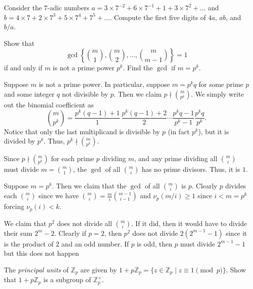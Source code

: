 \documentclass[12 pt, letterpaper]{hmcpset}
\begin{document}
\pagebreak

\begin{problem}[(3)]
	Consider the $7$-adic numbers $a = 3 \times 7^{-2} + 6 \times 7^{-1} + 1 + 3 \times 7^{2} + \dots$ and $b = 4 \times 7 + 2 \times 7^{3} + 5 \times 7^{4} + 7^{5} + \dots$. Compute the first five digits of $4a$, $ab$, and $b / a$.
\end{problem}

\pagebreak

\begin{problem}[(4)]
	Show that
	\[
		\gcd \left \{ \binom{m}{1}, \binom{m}{2}, \dots, \binom{m}{m - 1} \right \} = 1
	\]
	if and only if $m$ is not a prime power $p^{k}$. Find the $\gcd$ if $m = p^{k}$.
\end{problem}

\begin{solution}
	Suppose $m$ is not a prime power. In particular, suppose $m = p^{k} q$ for some prime $p$ and some integer $q$ not divisible by $p$. Then we claim $p \nmid \binom{m}{p^{k}}$. We simply write out the binomial coefficient as
	\[
		\binom{m}{p^{k}} = \frac{p^{k}(q - 1) + 1}{1} \, \frac{p^{k}(q - 1) + 2}{2} \cdots \frac{p^{k} q - 1}{p^{k} - 1} \frac{p^{k} q}{p^{k}}.
	\]
	Notice that only the last multiplicand is divisible by $p$ (in fact $p^{k}$), but it is divided by $p^{k}$. Thus, $p^{k} \nmid \binom{m}{p^{k}}$.

	Since $p \nmid \binom{m}{p^{k}}$ for each prime $p$ dividing $m$, and any prime dividing all $\binom{m}{i}$ must divide $m = \binom{m}{1}$, the $\gcd$ of all $\binom{m}{i}$ has no prime divisors. Thus, it is $1$.

	Suppose $m = p^{k}$. Then we claim that the $\gcd$ of all $\binom{m}{i}$ is $p$. Clearly $p$ divides each  $\binom{m}{i}$ since we have $\binom{m}{i} = \frac{m}{i} \binom{m - 1}{i - 1}$ and $\nu_{p}(m / i) \ge 1$ since $i < m = p^{k}$ forcing $\nu_{p}(i) < k$. 

	We claim that $p^{2}$ does not divide all $\binom{m}{i}$. If it did, then it would have to divide their sum $2^{m} - 2$. Clearly if $p = 2$, then $p^{2}$ does not divide $2(2^{m - 1} - 1)$ since it is the product of $2$ and an odd number. If $p$ is odd, then $p$ must divide $2^{m - 1} - 1$ but this does not happen
\end{solution}

\pagebreak

\begin{problem}[(5)]
	The \emph{principal units} of $\mathbb{Z}_{p}$ are given by $1 + p \mathbb{Z}_{p} = \{ z \in \mathbb{Z}_{p} \mid z \equiv 1 \pmod p \}$. Show that $1 + p \mathbb{Z}_{p}$ is a subgroup of $\mathbb{Z}_{p}^{\times}$.
\end{problem}
\end{document}
